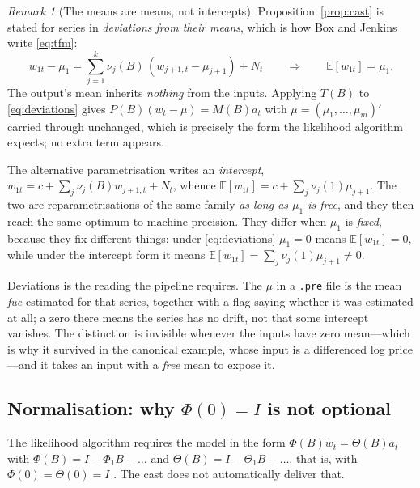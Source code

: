 \documentclass[11pt,a4paper]{article}
\theoremstyle{plain}
\theoremstyle{remark}
\newtheorem{remark}[proposition]{Remark}
\begin{document}
\begin{remark}[The means are means, not intercepts]
\label{rem:means}
Proposition~\ref{prop:cast} is stated for series in \emph{deviations from their
means}, which is how Box and Jenkins write \eqref{eq:tfm}:
\begin{equation}
w_{1t}-\mu_1 = \sum_{j=1}^{k}\nu_j(B)\,(w_{j+1,t}-\mu_{j+1}) + N_t
\qquad\Longrightarrow\qquad \mathbb{E}[w_{1t}]=\mu_1 .
\label{eq:deviations}
\end{equation}
The output's mean inherits \emph{nothing} from the inputs. Applying $T(B)$ to
\eqref{eq:deviations} gives $P(B)(w_t-\mu)=M(B)a_t$ with
$\mu=(\mu_1,\dots,\mu_m)'$ carried through unchanged, which is precisely the form
the likelihood algorithm expects; no extra term appears.

The alternative parametrisation writes an \emph{intercept},
$w_{1t}=c+\sum_j\nu_j(B)w_{j+1,t}+N_t$, whence
$\mathbb{E}[w_{1t}]=c+\sum_j\nu_j(1)\mu_{j+1}$. The two are reparametrisations of
the same family \emph{as long as $\mu_1$ is free}, and they then reach the same
optimum to machine precision. They differ when $\mu_1$ is \emph{fixed}, because
they fix different things: under \eqref{eq:deviations} $\mu_1=0$ means
$\mathbb{E}[w_{1t}]=0$, while under the intercept form it means
$\mathbb{E}[w_{1t}]=\sum_j\nu_j(1)\mu_{j+1}\neq0$.

Deviations is the reading the pipeline requires. The $\mu$ in a \texttt{.pre} file
is the mean \emph{fue} estimated for that series, together with a flag saying
whether it was estimated at all; a zero there means the series has no drift, not
that some intercept vanishes. The distinction is invisible whenever the inputs have
zero mean---which is why it survived in the canonical example, whose input is a
differenced log price---and it takes an input with a \emph{free} mean to expose it.
\end{remark}

\subsection{Normalisation: why \texorpdfstring{$\Phi(0)=I$}{Phi(0)=I} is not optional}

The likelihood algorithm requires the model in the form
$\Phi(B)\tilde w_t=\Theta(B)a_t$ with $\Phi(B)=I-\Phi_1B-\dots$ and
$\Theta(B)=I-\Theta_1B-\dots$, that is, with $\Phi(0)=\Theta(0)=I$
\cite{mauricio1997}. The cast does not automatically deliver that.
\end{document}
